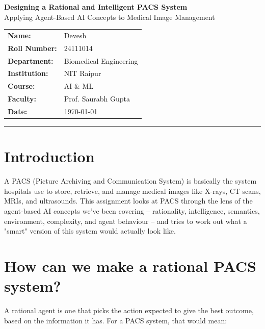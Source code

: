 \documentclass[11pt]{article}
\title{}
\date{}
\begin{document}
\begin{center}
{\LARGE \bfseries Designing a Rational and Intelligent PACS System}\\[0.4em]
{\large Applying Agent-Based AI Concepts to Medical Image Management}
\end{center}

\vspace{0.5cm}

\begin{center}
\begin{tabular}{ll}
\textbf{Name:} & Devesh \\
\textbf{Roll Number:} & 24111014 \\
\textbf{Department:} & Biomedical Engineering \\
\textbf{Institution:} & NIT Raipur \\
\textbf{Course:} & AI \& ML \\
\textbf{Faculty:} & Prof. Saurabh Gupta \\
\textbf{Date:} & \today \\
\end{tabular}
\end{center}

\vspace{1cm}
\hrule
\vspace{0.5cm}

\section*{Introduction}

A PACS (Picture Archiving and Communication System) is basically the system hospitals use to store, retrieve, and manage medical images like X-rays, CT scans, MRIs, and ultrasounds. This assignment looks at PACS through the lens of the agent-based AI concepts we've been covering -- rationality, intelligence, semantics, environment, complexity, and agent behaviour -- and tries to work out what a "smart" version of this system would actually look like.

\section{How can we make a rational PACS system?}

A rational agent is one that picks the action expected to give the best outcome, based on the information it has. For a PACS system, that would mean:
\end{document}

